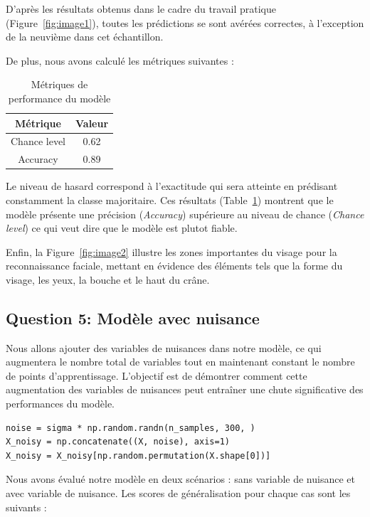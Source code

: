 \documentclass[11pt,a4paper]{article}
\begin{document}
D'après les résultats obtenus dans le cadre du travail pratique (Figure~\ref{fig:image1}), toutes les prédictions se sont avérées correctes, à l'exception de la neuvième dans cet échantillon.

De plus, nous avons calculé les métriques suivantes :

\begin{table}[H]
    \centering
    \begin{tabular}{|cc|}
        \hline
        \textbf{Métrique}     & \textbf{Valeur} \\ \hline
        Chance level          & 0.62            \\
        Accuracy              & 0.89            \\ \hline
    \end{tabular}
    \caption{Métriques de performance du modèle}
    
    \label{table1}
\end{table}
Le niveau de hasard correspond à l'exactitude qui sera atteinte en prédisant constamment la classe majoritaire.
Ces résultats (Table~\ref{table1}) montrent que le modèle présente une précision (\textit{Accuracy}) supérieure au niveau de chance (\textit{Chance level}) ce qui veut dire que le modèle est plutot fiable. 

Enfin, la Figure~\ref{fig:image2} illustre les zones importantes du visage pour la reconnaissance faciale, mettant en évidence des éléments tels que la forme du visage, les yeux, la bouche et le haut du crâne.

\subsection{Question 5: Modèle avec nuisance}

Nous allons ajouter des variables de nuisances dans notre modèle, ce qui augmentera le nombre total de variables tout en maintenant constant le nombre de points d'apprentissage. L'objectif est de démontrer comment cette augmentation des variables de nuisances peut entraîner une chute significative des performances du modèle.

\begin{verbatim}
noise = sigma * np.random.randn(n_samples, 300, )
X_noisy = np.concatenate((X, noise), axis=1)
X_noisy = X_noisy[np.random.permutation(X.shape[0])]
\end{verbatim}

Nous avons évalué notre modèle en deux scénarios : sans variable de nuisance et avec variable de nuisance. Les scores de généralisation pour chaque cas sont les suivants :
\end{document}
